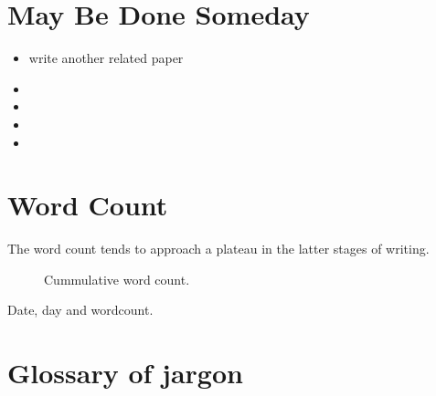 \documentclass[11pt,letterpaper]{article}
\begin{document}
\section{May Be Done Someday}
\label{sec:org3a473a7}

\begin{itemize}
\item write another related paper
\item 

\item 

\item 

\item 
\end{itemize}


\section{Word Count}
\label{sec:org53e6e58}

The word count tends to approach a plateau in the latter stages of writing.


\begin{figure}[H]
\centering
{}
\caption{Cummulative word count.}
\end{figure}

\begin{table}[]
\centering
{}
\caption{Date, day and wordcount.}
\label{tab:my_label}
\end{table}



\section{Glossary of jargon}
\label{sec:org186d0e3}
\end{document}
